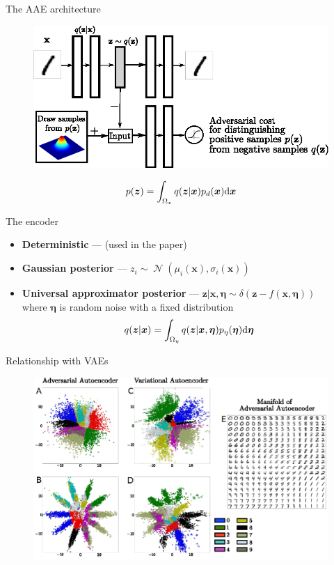 \documentclass[10pt]{beamer}
\DeclareMathOperator{\Norm}{\mathcal N}
\newcommand{\vect}[1]{\boldsymbol{#1}} %
\begin{document}
\begin{frame}{The AAE architecture}
\begin{figure}
  \centering
  \includegraphics[width=0.8\linewidth]{../images/aae-architecture-01.png}
\end{figure}
\[ p(\vect z) = \int_{\Omega_x} q(\vect z | \vect x) p_d(\vect x) \text d \vect x \]
\end{frame}

\begin{frame}{The encoder}
\begin{itemize}
  \setlength\itemsep{1.5em}
  \item \textbf{Deterministic} — (used in the paper)
  \item \textbf{Gaussian posterior} — $ z_i \sim \Norm(\mu_i(\vect x), \sigma_i(\vect x)) $
  \item \textbf{Universal approximator posterior} — $ \vect z | \vect x, \vect \eta \sim \delta(\vect z - f(\vect x, \vect \eta)) $ \\ where $ \vect \eta $ is random noise with a fixed distribution
  \[ q(\vect z | \vect x) = \int_{\Omega_\eta} q(\vect z | \vect x, \vect \eta) p_\eta(\vect \eta) \text d \vect \eta \]
\end{itemize}
\end{frame}

\begin{frame}{Relationship with VAEs}
\begin{figure}
  \centering
  \includegraphics[width=0.8\linewidth]{../images/aae-embedding-01.png}
\end{figure}
\end{frame}
\end{document}
